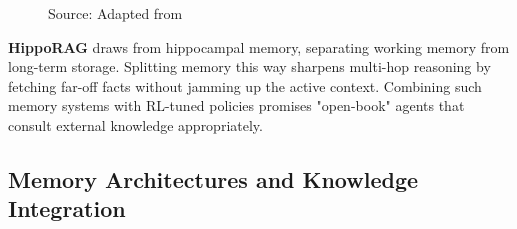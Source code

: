 \documentclass[12pt,a4paper]{report}
\theoremstyle{definition}
\newcommand{\source}[1]{\vspace{-0.5\baselineskip}\caption*{\small Source: #1}}
\begin{document}
\begin{figure}[htbp]
\centering
{}
\caption{How Retrieval-Augmented Generation grounds knowledge. Given a query, the system pulls Top-K relevant chunks from a knowledge base using hybrid search (BM25 + dense embeddings). Retrieved context merges with the query and feeds into the language model. This curbs hallucination and lets the system tap into current facts beyond its training cutoff, boosting factual accuracy 15--30\% on knowledge-heavy tasks.}
\label{fig:rag_architecture}
\source{Adapted from \citet{gao2023retrieval}}
\end{figure}

\textbf{HippoRAG} \cite{gutierrez2024hipporag} draws from hippocampal memory, separating working memory from long-term storage. Splitting memory this way sharpens multi-hop reasoning by fetching far-off facts without jamming up the active context. Combining such memory systems with RL-tuned policies promises "open-book" agents that consult external knowledge appropriately.

\subsection{Memory Architectures and Knowledge Integration}
\label{sec:memory}
\end{document}
